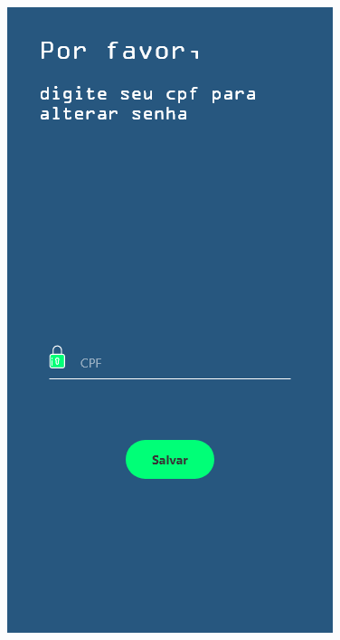 \documentclass[
	12pt,				%
	openright,			%
	oneside,			%
	a4paper,			%
	english,			%
	brazil,				%
	]{abntex2}
\theoremstyle{theorem}
\theoremstyle{definition}
\begin{document}
\begin{figure}[H]
\begin{minipage}{.3\textwidth}
  \includegraphics[width=.9\linewidth]{imagens/prototipoEsqueciSenha.png}
  \label{fig: Tela esqueci minha senha}
\end{minipage}%
\begin{minipage}{.3\textwidth}
  \centering

\end{minipage}
\end{figure}
\end{document}
